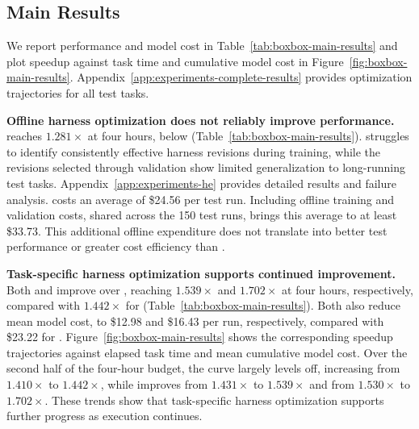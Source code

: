 \subsection{Main Results}
\label{sec:experiments-main}

We report performance and model cost in Table~\ref{tab:boxbox-main-results} and plot speedup against task time and cumulative model cost in Figure~\ref{fig:boxbox-main-results}. Appendix~\ref{app:experiments-complete-results} provides optimization trajectories for all test tasks.



\textbf{Offline harness optimization does not reliably improve performance.}
\he{} reaches \(1.281\times\) at four hours, below \frozen{} (Table~\ref{tab:boxbox-main-results}). \he{} struggles to identify consistently effective harness revisions during training, while the revisions selected through validation show limited generalization to long-running test tasks. Appendix~\ref{app:experiments-he} provides detailed results and failure analysis. \he{} costs an average of \$24.56 per test run. Including offline training and validation costs, shared across the 150 test runs, brings this average to at least \$33.73. This additional offline expenditure does not translate into better test performance or greater cost efficiency than \frozen{}.

\textbf{Task-specific harness optimization supports continued improvement.}
Both \hs{} and \boxbox{} improve over \frozen{}, reaching \(1.539\times\) and \(1.702\times\) at four hours, respectively, compared with \(1.442\times\) for \frozen{} (Table~\ref{tab:boxbox-main-results}). Both also reduce mean model cost, to \$12.98 and \$16.43 per run, respectively, compared with \$23.22 for \frozen{}. Figure~\ref{fig:boxbox-main-results} shows the corresponding speedup trajectories against elapsed task time and mean cumulative model cost. Over the second half of the four-hour budget, the \frozen{} curve largely levels off, increasing from \(1.410\times\) to \(1.442\times\), while \hs{} improves from \(1.431\times\) to \(1.539\times\) and \boxbox{} from \(1.530\times\) to \(1.702\times\). These trends show that task-specific harness optimization supports further progress as execution continues.


